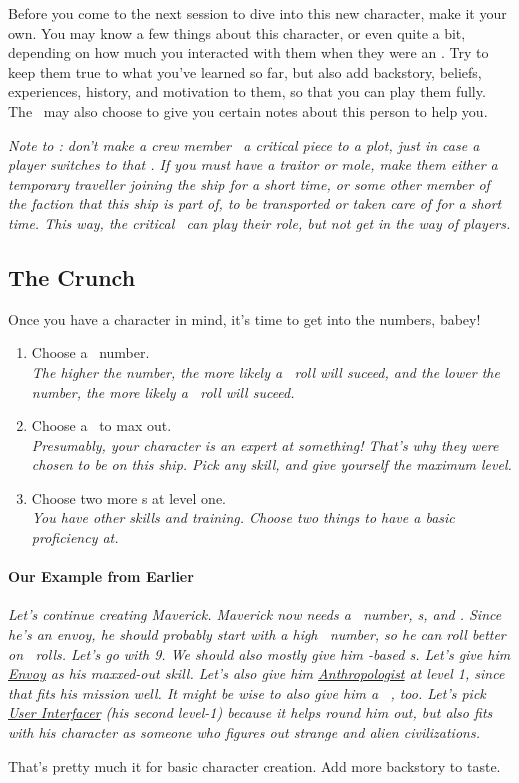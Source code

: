 \par
Before you come to the next session to dive into this new character, make it your own. You may know a few things about this character, or even quite a bit, depending on how much you interacted with them when they were an \npcShort . Try to keep them true to what you've learned so far, but also add backstory, beliefs, experiences, history, and motivation to them, so that you can play them fully. The \gm\, may also choose to give you certain notes about this person to help you.

\par
\textit{Note to \gm : don't make a crew member \npcShort\, a critical piece to a plot, just in case a player switches to that \npcShort . If you must have a traitor or mole, make them either a temporary traveller joining the ship for a short time, or some other member of the faction that this ship is part of, to be transported or taken care of for a short time. This way, the critical \npcShort\, can play their role, but not get in the way of players.}

\subsection{The Crunch}

\par
Once you have a character in mind, it's time to get into the numbers, babey!
\begin{enumerate}
	\item Choose a \both\, number. \\
		\textit{The higher the number, the more likely a \feelings\, roll will suceed, and the lower the number, the more likely a \lasers\, roll will suceed.}
	\item Choose a \skill\, to max out.\\
		\textit{Presumably, your character is an expert at something! That's why they were chosen to be on this ship. Pick any skill, and give yourself the maximum level.}
	\item Choose two more \skill s at level one. \\
		\textit{You have other skills and training. Choose two things to have a basic proficiency at.}
\end{enumerate}

\paragraph{Our Example from Earlier}
\textit{Let's continue creating Maverick. Maverick now needs a \both\, number, \skill s, and \abilityP . Since he's an envoy, he should probably start with a high \both\, number, so he can roll better on \feelings\, rolls. Let's go with 9. We should also mostly give him \feelings -based \skill s. Let's give him \hyperlink{SkillEnvoy}{Envoy} as his maxxed-out skill. Let's also give him \hyperlink{SkillAnthropologist}{Anthropologist} at level 1, since that fits his mission well. It might be wise to also give him a \lasers\, \skill , too. Let's pick \hyperlink{SkillUserInterfacer}{User Interfacer} (his second level-1) because it helps round him out, but also fits with his character as someone who figures out strange and alien civilizations.}

\par
That's pretty much it for basic character creation. Add more backstory to taste.